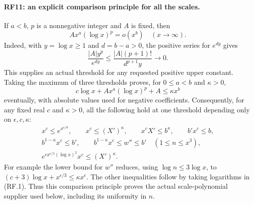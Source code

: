 \documentclass[11pt,a4paper]{article}
\numberwithin{equation}{section}
\theoremstyle{remark}\newtheorem{remark}[theorem]{Remark}
\begin{document}
\paragraph{RF11: an explicit comparison principle for all the scales.}
If $a<b$, $p$ is a nonnegative integer and $A$ is fixed, then
\[
             A x^a(\log x)^p=o(x^b)\quad(x\longrightarrow\infty).
                                                               \tag{RF.24}
\]
Indeed, with $y=\log x\geq1$ and $d=b-a>0$, the positive series for
$e^{dy}$ gives
\[
 \frac{|A|y^p}{e^{dy}}
       \leq \frac{|A|(p+1)!}{d^{p+1}y}\longrightarrow0.
\]
This supplies an actual threshold for any requested positive upper
constant. Taking the maximum of three thresholds proves, for
$0\leq a<b$ and $\kappa>0$,
\[
 c\log x+A x^a(\log x)^p+A\leq\kappa x^b                 \tag{RF.25}
\]
eventually, with absolute values used for negative coefficients.
Consequently, for any fixed real $c$ and $\kappa>0$, all the following
hold at one threshold depending only on $\epsilon,c,\kappa$:
\begin{gather*}
 x^c\leq e^{x^{\epsilon/8}},\qquad
 x^c\leq (X')^\kappa,\qquad x^cX'\leq b^\kappa,
 \qquad b'x^c\leq b,\\
 b^{1-\kappa}x^c\leq b',\qquad
 b^{1-\kappa}x^c\leq w''\leq b'
       \quad(1\leq n\leq x^3),\\
 e^{c x^{\epsilon/5}(\log x)^2}x^c\leq(X')^\kappa.
                                                               \tag{RF.26}
\end{gather*}
For example the lower bound for $w''$ reduces, using
$\log n\leq3\log x$, to
$(c+3)\log x+x^{\epsilon/3}\leq\kappa x^\epsilon$.
The other inequalities follow by taking logarithms in (RF.1).
Thus this comparison principle proves the actual scale-polynomial
supplier used below, including its uniformity in $n$.
\end{document}

